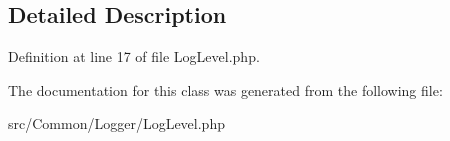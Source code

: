 \subsection{Detailed Description}


Definition at line 17 of file Log\+Level.\+php.



The documentation for this class was generated from the following file\+:\begin{DoxyCompactItemize}
\item 
src/\+Common/\+Logger/Log\+Level.\+php\end{DoxyCompactItemize}
